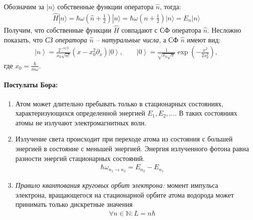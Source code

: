 \documentclass[__minimum__.tex]{subfiles}
\begin{document}
Обозначим за $|n\rangle$ собственные функции оператора $\hat{n}$, тогда:
\begin{gather*}
  \hat{H}|n\rangle
  =
  \hbar\omega\left(\hat{n}+\frac{1}{2}\right)|n\rangle
  =
  \hbar\omega\left(n+\frac{1}{2}\right)|n\rangle
  =
  E_n|n\rangle
\end{gather*}
Получим, что собственные функции $\hat{H}$ совпадают с СФ оператора $\hat{n}$. Несложно показать, что \emph{СЗ оператора $\hat{n}$ -- натуральные числа}, а СФ $\hat{n}$ имеют вид:
\begin{gather}
  \left|n\right>
  =
  \frac{2^{-n/2}}{x_0\sqrt{n!}}\left(x-x_0^2\partial_{x}\right)\left|0\right>,
  \qquad
  \left|0\right>
  =
  \frac{1}{\sqrt{x_0\sqrt{\pi}}}\exp\left(-\frac{x^2}{2x_0^2}\right),
\end{gather}
где $x_0=\frac{\hbar}{m\omega}$.

\paragraph{Постулаты Бора:}
\begin{enumerate}
  \item
        Атом может длительно пребывать только в стационарных состояниях, характеризующихся определенной энергией $E_1,E_2,...$. В таких состояниях атомы не излучают электромагнитных волн.
  \item
        Излучение света происходит при переходе атома из состояния с большей энергией в состояние с меньшей энергией. Энергия излученного фотона равна разности энергий стационарных состояний.
        \begin{gather*}
          \hbar\omega_{n_1 \rightarrow n_2} = E_{n_2} - E_{n_1}
        \end{gather*}
  \item
        \textit{Правило квантования круговых орбит электрона:} момент импульса электрона, вращающегося на стационарной орбите атома водорода может принимать только дискретные значения
        \begin{gather*}
          \forall n\in\mathbb{N}\colon L = n\hbar
        \end{gather*}
\end{enumerate}
\end{document}
